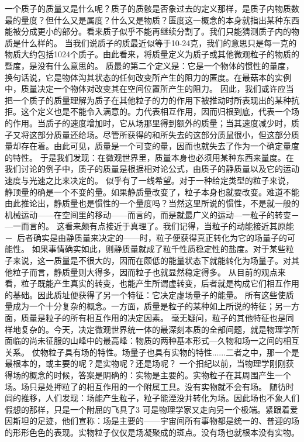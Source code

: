 一个质子的质量又是什么呢？质子的质骸是否象过去的定义那样，是质子内物质数最的量度？但什么又是属度？什么又是物质？匮度这一概念的本身就指出某种东西能被分成更小的部分。看来质子似乎不能再继续分割了。我们只能猜测质子内的物质是什么样的。
当我们说质子的质最近似等于10-24克，我们的意思只是每一克的物质大约包括1024个质子。由此看来，将质量定义为质子或其他微观粒子的物质的暨度，是没有什么意思的。
质最的第二个定义是：它是一个物体的惯性的量度，换句话说，它是物体沟其状态的任何改变所产生的阻力的匿度。在最菇本的实例中，质量决定一个物体对改变其在空间位置所产生的阻力。
因此，我们或许应当把一个质子的质量理解为质子在其他粒子的力的作用下被推动时所表现出的某种抗拒。这个定义也是不能令入满意的。力代表相互作用，因而归根到底，代表一个场的作用。当质子的速度增加时，它从场那里得到额外的质量；当其速度减少时，质子又将这部分质量还给场。尽管所获得的和所失去的这部分质鼠很小，但这部分质量却存在着。由此可见，质量是一个可变的量，因而也就失去了作为一个确定量度的特性。
于是我们发现：在微观世界里，质量本身也必须用某种东西来量度。在我们讨论的例子中，质子的质量是根据相对论公式，由质子的静质量以及它的运动速度与光速之比来决定的。
似乎有了一线希望。对于一种给定类型的粒子来说，静顶量的确是一个不变的量。如果静质量改变了，粒子本身也就要改变。难道不能由此推论出，静质量也是惯性的一个量度吗？当然这里所说的惯性，不是就一般的机械运动——在空间里的移动——而言的，而是就最广义的运动—一粒子的转变－—一而言的。
这看来颇有点接近于真理了。我们记得，当粒子的动能接近其原能－~后者确实是由静质量来决定的——时，粒子便获得真正转化为它的场量子的可能性。
如果事情确实如此，则静质量就成了粒千性质稳定性的盐度。对于某些粒子来说，这一质量是不很大的，因而在颇低的能量状态下就能转化为场量子。对其他粒子而言，静质量则大得多，因而粒子也就显然稳定得多。
从目前的观点来看，粒子既能产生真实的转变，也能产生所谓虚转变，后者就是构成它们相互作用的基础。因此质址便获得了另一个特征：它决定虚场量子的能量。
所有这些使质量成为一个十分复杂的概念。一方面，质量是粒子的某种如上所说的特征；另一方面，质量是粒子的所有相互作用的决定因素。
毫无疑问，粒子的其他特征也是同样地复杂的。今天，决定微观世界统一体的最深刻本质的全部间题，就是物理学所面临的尚未征服的山峰中的最高峰：物质的两种基本形式—久物和场一之间的相互关系。
仗物粒子具有场的特性。场量子也具有实物的特性......二者之中，那一个是最根本的，或主要的呢？是实物呢？还是场呢？
一个抇纪以前，当物理学刚刚获得场的概念的时候，答案是阴确的：实物是主要的。实物粒子在其周围产生一个场。场只是处押粒了的相互作用的一个附属工具。没有实物就不会有场。
随彷时闾的推移，人们发现：场能产生粒子，粒子能湮没并转化为场。因此场也不象人们假想的那样，只是一个附屈的飞具了3
可是物理学家又走向另一个极端。紧跟着爱因斯坦的足迹，他们宣称：场是主要的——宇宙间所有事物都是统一的、普迎的场的形形色色的表现。实物粒子仅仅是场凝聚成的斑点。没有场也就根本没有实物。

